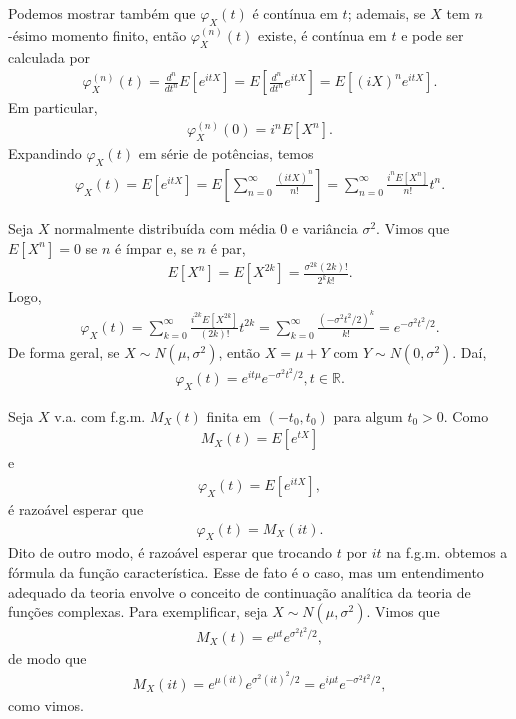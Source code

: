 \documentclass[../Notas.tex]{subfiles}
\begin{document}
Podemos mostrar também que $\varphi_X(t)$ é contínua em $t$; ademais, se $X$ tem $n$-ésimo momento finito, então $\varphi_X^{(n)}(t)$ existe, é contínua em $t$ e pode ser calculada por
\begin{align*}
    \varphi_X^{(n)}(t) = \frac{d^n}{dt^n}E[e^{itX}] = E[\frac{d^n}{dt^n}e^{itX}] = E[(iX)^ne^{itX}].
\end{align*}
Em particular,
\begin{align*}
    \varphi_X^{(n)}(0) = i^nE[X^n].
\end{align*}
Expandindo $\varphi_X(t)$ em série de potências, temos
\begin{align*}
    \varphi_X(t) = E[e^{itX}] = E\left[ \sum_{n=0}^{\infty} \frac{(itX)^n}{n!} \right] = \sum_{n=0}^{\infty} \frac{i^nE[X^n]}{n!}t^n.
\end{align*}

\begin{example}
    Seja $X$ normalmente distribuída com média 0 e variância $\sigma^2$. Vimos que $E[X^n] = 0$ se $n$ é ímpar e, se $n$ é par,
    \begin{align*}
        E[X^n] = E[X^{2k}] = \frac{\sigma^{2k}(2k)!}{2^kk!}.
    \end{align*}
    Logo,
    \begin{align*}
        \varphi_X(t) = \sum_{k=0}^{\infty} \frac{i^{2k}E[X^{2k}]}{(2k)!}t^{2k} = \sum_{k=0}^{\infty} \frac{(-\sigma^2t^2/2)^k}{k!} = e^{-\sigma^2t^2/2}.
    \end{align*}
    De forma geral, se $X\sim N(\mu, \sigma^2)$, então $X = \mu + Y$ com $Y\sim N(0,\sigma^2)$. Daí,
    \begin{align*}
        \varphi_X(t) = e^{it\mu}e^{-\sigma^2t^2/2}, t\in\mathbb{R}.
    \end{align*}
\end{example}
Seja $X$ v.a. com f.g.m. $M_X(t)$ finita em $(-t_0, t_0)$ para algum $t_0>0$. Como
\begin{align*}
    M_X(t) = E[e^{tX}]
\end{align*}
e
\begin{align*}
    \varphi_X(t) = E[e^{itX}],
\end{align*}
é razoável esperar que
\begin{align*}
    \varphi_X(t) = M_X(it).
\end{align*}
Dito de outro modo, é razoável esperar que trocando $t$ por $it$ na f.g.m. obtemos a fórmula da função característica. Esse de fato é o caso, mas um entendimento adequado da teoria envolve o conceito de continuação analítica da teoria de funções complexas. Para exemplificar, seja $X\sim N(\mu, \sigma^2)$. Vimos que
\begin{align*}
    M_X(t) = e^{\mu t}e^{\sigma^2t^2/2},
\end{align*}
de modo que
\begin{align*}
    M_X(it) = e^{\mu(it)}e^{\sigma^2(it)^2/2} = e^{i\mu t}e^{-\sigma^2t^2/2},
\end{align*}
como vimos.
\end{document}
